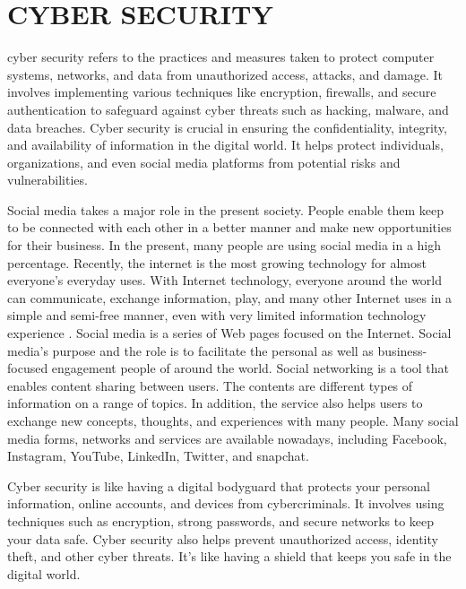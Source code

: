 \chapter{ CYBER SECURITY}



\hspace*{0.3in} cyber security refers to the practices and measures taken to protect computer systems, networks, and data from unauthorized access, attacks, and damage. It involves implementing various techniques like encryption, firewalls, and secure authentication to safeguard against cyber threats such as hacking, malware, and data breaches. Cyber security is crucial in ensuring the confidentiality, integrity, and availability of information in the digital world. It helps protect individuals, organizations, and even social media platforms from potential risks and vulnerabilities.

Social media takes a major role in the present society.
People enable them keep to be connected with each other in a
better manner and make new opportunities for their business.
In the present, many people are using social media in a high
percentage. Recently, the internet is the most growing
technology for almost everyone's everyday uses. With Internet
technology, everyone around the world can communicate,
exchange information, play, and many other Internet uses in a
simple and semi-free manner, even with very limited
information technology experience . Social media is a
series of Web pages focused on the Internet. Social media’s
purpose and the role is to facilitate the personal as well as
business-focused engagement people of around the world.
Social networking is a tool that enables content sharing
between users. The contents are different types of information
on a range of topics. In addition, the service also helps users
to exchange new concepts, thoughts, and experiences with
many people. Many social media forms, networks and
services are available nowadays, including Facebook,
Instagram, YouTube, LinkedIn, Twitter, and snapchat.

 Cyber security is like having a digital bodyguard that protects your personal information, online accounts, and devices from cybercriminals. It involves using techniques such as encryption, strong passwords, and secure networks to keep your data safe. Cyber security also helps prevent unauthorized access, identity theft, and other cyber threats. It's like having a shield that keeps you safe in the digital world.

